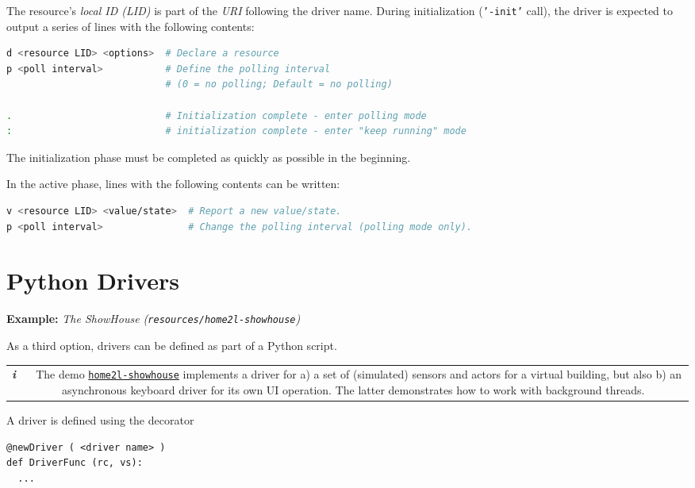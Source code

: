 \documentclass[12pt,english,parskip=half]{scrreprt}
\newcommand{\infobox}[1]{
  \hfill
  \setlength\arrayrulewidth{1pt}
  \begin{tabular}[t]{c|c|}
    \parbox{1.8em}{\hfill\textit{\Huge\textbf{i}\,}}
    &
    \,\parbox{0.89\linewidth}{\setlength{\parskip}{0.5em}#1}\,
  \end{tabular}
  \par
}
\newcommand{\idx}[1]{#1\index{#1}}
\newcommand{\toolref}[1]{\hyperref[tool:#1]{\texttt{\idx{#1}}}}
\begin{document}
The resource's \emph{local ID (LID)} is part of the \emph{URI} following the driver name.
During initialization (\texttt{'-init'} call), the driver is expected
to output a series of lines with the following contents:

\begin{lstlisting}[language=bash]
d <resource LID> <options>  # Declare a resource
p <poll interval>           # Define the polling interval
                            # (0 = no polling; Default = no polling)

.                           # Initialization complete - enter polling mode
:                           # initialization complete - enter "keep running" mode
\end{lstlisting}

The initialization phase must be completed as quickly as possible in the beginning.

In the active phase, lines with the following contents can be written:

\begin{lstlisting}[language=bash]
v <resource LID> <value/state>  # Report a new value/state.
p <poll interval>               # Change the polling interval (polling mode only).
\end{lstlisting}





\section{Python Drivers}
\label{sec:drvdev-python}


\textbf{Example:} \emph{The ShowHouse (\texttt{resources/home2l-showhouse})}

As a third option, drivers can be defined as part of a Python script.

\infobox{
  The demo \toolref{home2l-showhouse} implements a driver for a) a set of (simulated)
  sensors and actors for a virtual building, but also
  b) an asynchronous keyboard driver for its own UI operation.
  The latter demonstrates how to work with background threads.
}

A driver is defined using the decorator

\begin{lstlisting}
@newDriver ( <driver name> )
def DriverFunc (rc, vs):
  ...
\end{lstlisting}
\end{document}
